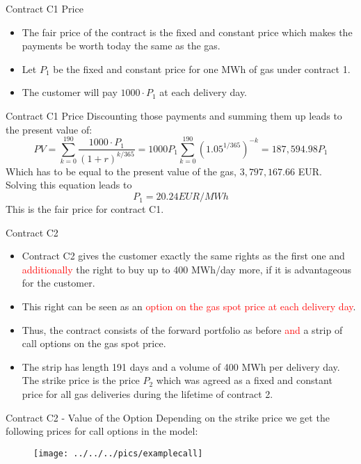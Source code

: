 {Contract C1 Price}
\begin{itemize}
\item<1-> The fair price of the contract is the fixed and constant price which makes the payments be worth today the same as the gas.
\item<2-> Let $P_1$ be the fixed and constant price for one MWh of gas under contract 1.
\item<3-> The customer will pay $1000 \cdot P_1$ at each delivery day.
\end{itemize}


{Contract C1 Price}
Discounting those payments and summing them up leads to the present value of:
$$
	PV = \sum_{k=0}^{190}{\frac{1000 \cdot P_1}{(1 + r)^{k/365}}} = 1000 P_1 \sum_{k=0}^{190} (1.05^{1/365})^{-k} = 187,594.98 P_1
$$
Which has to be equal to the present value of the gas, $3,797,167.66$ EUR. Solving this equation leads to
$$
	P_1 = 20.24 EUR/MWh
$$
This is the fair price for contract C1.




{Contract C2}
\begin{itemize}
\item<1-> Contract C2 gives the customer exactly the same rights as the first one and \textcolor{red}{additionally} the right to buy up to 400 MWh/day more, if it is advantageous for the customer.
\item<2-> This right can be seen as an \textcolor{red}{option on the gas spot price at each delivery day}.
\item<3-> Thus, the contract consists of the forward portfolio as before \textcolor{red}{and} a strip of call options on the gas spot price.
\item<4-> The strip has length 191 days and a volume of 400 MWh per delivery day. The strike price is the price $P_2$ which was agreed as a fixed and constant price for all gas deliveries during the lifetime of contract 2.
\end{itemize}



{Contract C2 - Value of the Option}
Depending on the strike price we get the following prices for call options in the model:
\begin{figure}
	\centering
		\texttt{[image: ../../../pics/examplecall]}
	\label{fig:examplecall}
\end{figure}



